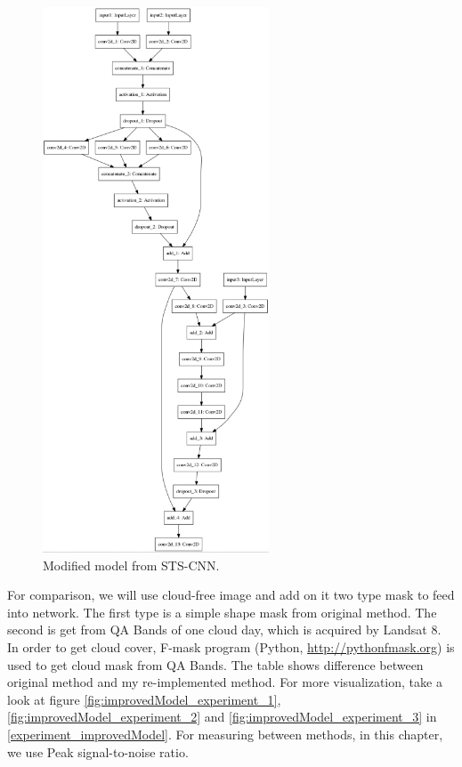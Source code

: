 \begin{figure}[h!]
	\centering
	\includegraphics[width=0.6\textwidth]{figures/modifiedModel.png}
	\caption{Modified model from STS-CNN.}
	\label{fig:modifiedModel}
\end{figure}	

For comparison, we will use cloud-free image and add on it two type mask to feed into network. The first type is a simple shape mask from original method. The second is get from QA Bands of one cloud day, which is acquired by Landsat 8. In order to get cloud cover, F-mask program (Python, \href{http://pythonfmask.org}{http://pythonfmask.org}) is used to get cloud mask from QA Bands. The table shows difference between original method and my re-implemented method. For more visualization, take a look at figure \ref{fig:improvedModel_experiment_1}, \ref{fig:improvedModel_experiment_2} and \ref{fig:improvedModel_experiment_3} in \ref{experiment_improvedModel}. For measuring between methods, in this chapter, we use Peak signal-to-noise ratio.

